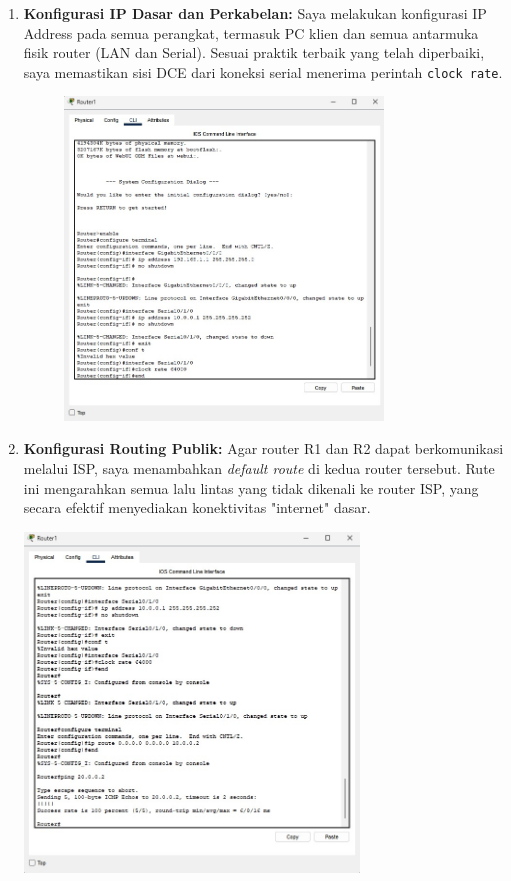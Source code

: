 \begin{enumerate}
    \item \textbf{Konfigurasi IP Dasar dan Perkabelan:} Saya melakukan konfigurasi IP Address pada semua perangkat, termasuk PC klien dan semua antarmuka fisik router (LAN dan Serial). Sesuai praktik terbaik yang telah diperbaiki, saya memastikan sisi DCE dari koneksi serial menerima perintah \texttt{clock rate}.
    \begin{figure}[H]
        \centering
        \includegraphics[width=0.8\textwidth]{img5/R1IPConf.jpeg}
    \end{figure}

    \item \textbf{Konfigurasi Routing Publik:} Agar router R1 dan R2 dapat berkomunikasi melalui ISP, saya menambahkan \textit{default route} di kedua router tersebut. Rute ini mengarahkan semua lalu lintas yang tidak dikenali ke router ISP, yang secara efektif menyediakan konektivitas "internet" dasar.
    \begin{center}
        \includegraphics[width=0.7\textwidth]{img5/PingR1R2.jpeg}
    \end{center}


\end{enumerate}
